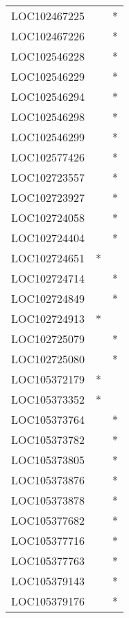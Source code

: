 \begin{longtable}{lcc}
LOC102467225    &                &          * \\
LOC102467226    &                &          * \\
LOC102546228    &                &          * \\
LOC102546229    &                &          * \\
LOC102546294    &                &          * \\
LOC102546298    &                &          * \\
LOC102546299    &                &          * \\
LOC102577426    &                &          * \\
LOC102723557    &                &          * \\
LOC102723927    &                &          * \\
LOC102724058    &                &          * \\
LOC102724404    &                &          * \\
LOC102724651    &              * &            \\
LOC102724714    &                &          * \\
LOC102724849    &                &          * \\
LOC102724913    &              * &            \\
LOC102725079    &                &          * \\
LOC102725080    &                &          * \\
LOC105372179    &              * &            \\
LOC105373352    &              * &            \\
LOC105373764    &                &          * \\
LOC105373782    &                &          * \\
LOC105373805    &                &          * \\
LOC105373876    &                &          * \\
LOC105373878    &                &          * \\
LOC105377682    &                &          * \\
LOC105377716    &                &          * \\
LOC105377763    &                &          * \\
LOC105379143    &                &          * \\
LOC105379176    &                &          * \\

\end{longtable}
